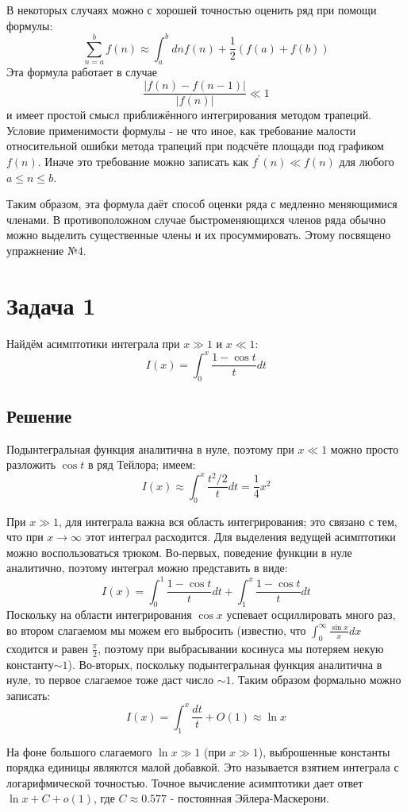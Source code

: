 \documentclass[a4paper,12pt]{article}
\begin{document}
В некоторых случаях можно с хорошей точностью оценить ряд при помощи формулы:
$$
\sum_{n=a}^{b} f(n)\approx\int_{a}^{b} dn f(n)+\frac{1}{2}\left(f(a)+f(b)\right)
$$
Эта формула работает в случае
$$
\frac{|f(n)-f(n-1)|}{|f(n)|}\ll1
$$
и имеет простой смысл приближённого интегрирования методом трапеций. Условие применимости формулы - не что иное, как требование малости относительной ошибки метода трапеций при подсчёте площади под графиком $f(n)$. Иначе это требование можно записать как $f^{\prime}(n)\ll f(n)$ для любого $a\le n\le b$. 

\noindent
Таким образом, эта формула даёт способ оценки ряда с медленно меняющимися членами. В противоположном случае быстроменяющихся членов ряда обычно можно выделить существенные члены и их просуммировать. Этому посвящено упражнение №4.
\section*{Задача 1}

Найдём асимптотики интеграла при $x\gg1$ и $x\ll1$:
\[
I(x)=\int_{0}^{x}\frac{1-\cos t}{t}dt
\]



\subsection*{Решение}

Подынтегральная функция аналитична в нуле, поэтому при $x\ll1$ можно
просто разложить $\cos t$ в ряд Тейлора; имеем:
\[
I\left(x\right)\approx\int_{0}^{x}\frac{t^{2}/2}{t}dt=\frac{1}{4}x^{2}
\]

\noindent
При $x\gg1$, для интеграла важна вся область интегрирования; это
связано с тем, что при $x\to\infty$ этот интеграл расходится. Для
выделения ведущей асимптотики можно воспользоваться трюком. Во-первых,
поведение функции в нуле аналитично, поэтому интеграл можно представить
в виде:
\[
I\left(x\right)=\int_{0}^{1}\frac{1-\cos t}{t}dt+\int_{1}^{x}\frac{1-\cos t}{t}dt
\]
Поскольку на области интегрирования $\cos x$ успевает осциллировать
много раз, во втором слагаемом мы можем его выбросить (известно, что
$\int_{0}^{\infty}\frac{\sin x}{x}dx$ сходится и равен $\frac{\pi}{2}$,
поэтому при выбрасывании косинуса мы потеряем некую константу$\sim1$).
Во-вторых, поскольку подынтегральная функция аналитична в нуле, то
первое слагаемое тоже даст число $\sim1$. Таким образом формально
можно записать:
\[
I\left(x\right)=\int_{1}^{x}\frac{dt}{t}+O(1)\approx\ln x
\]

\noindent
На фоне большого слагаемого $\ln x\gg1$ (при $x\gg1$), выброшенные
константы порядка единицы являются малой добавкой. Это называется
взятием интеграла с логарифмической точностью. Точное вычисление асимптотики
дает ответ $\ln x+C+o(1)$, где $C\approx0.577$ - постоянная Эйлера-Маскерони.
\end{document}

